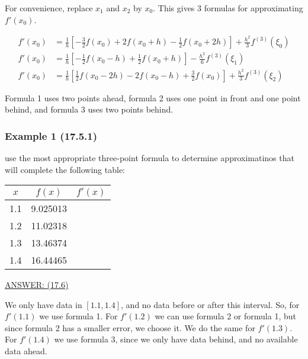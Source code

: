 For convenience, replace $x_1$ and $x_2$ by $x_0$. This gives 3 formulas for
approximating $f'(x_0)$.

\begin{align*}
    f'(x_0) &= \frac{1}{h} \left[ -\frac{3}{2} f(x_0) + 2 f(x_0 + h) - \frac{1}{2} f(x_0 + 2h) \right] 
    + \frac{h^2}{3} f^{(3)}(\xi_0) \\[10pt]
    f'(x_0) &= \frac{1}{h} \left[ -\frac{1}{2} f(x_0 - h) + \frac{1}{2} f(x_0 + h) \right] 
    - \frac{h^2}{6} f^{(3)}(\xi_1) \\[10pt]
    f'(x_0) &= \frac{1}{h} \left[ \frac{1}{2} f(x_0 - 2h) - 2 f(x_0 - h) + \frac{3}{2} f(x_0) \right] 
    + \frac{h^2}{3} f^{(3)}(\xi_2)
\end{align*}

Formula 1 uses two points ahead, formula 2 uses one point in front and one point
behind, and formula 3 uses two points behind.

\pagebreak
\subsubsection{Example 1 (17.5.1)}\label{sec:example_1}

\Ex use the most appropriate three-point formula to determine approximatinos
that will complete the following table:

\begin{table}[h]
    \centering
    \begin{tabular}{|c|c|c|}
        \hline
        $x$  & $f(x)$    & $f'(x)$ \\ 
        \hline
        1.1  & 9.025013  &  \\ 
        1.2  & 11.02318  &  \\ 
        1.3  & 13.46374  &  \\ 
        1.4  & 16.44465  &  \\ 
        \hline
    \end{tabular}
\end{table}

\uline{ANSWER: (17.6)}

We only have data in $[1.1, 1.4]$, and no data before or after this interval.
So, for $f'(1.1)$ we use formula 1. For $f'(1.2)$ we can use formula 2 or
formula 1, but since formula 2 has a smaller error, we choose it. We do the same
for $f'(1.3)$. For $f'(1.4)$ we use formula 3, since we only have data behind,
and no available data ahead.

